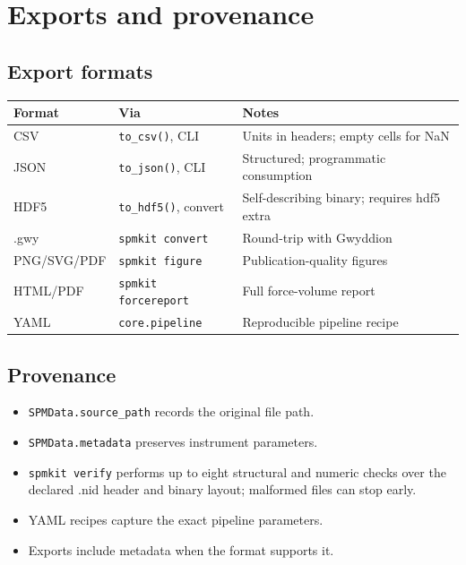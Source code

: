 \documentclass[a4paper,11pt]{article}
\begin{document}
\section{Exports and provenance}

\subsection{Export formats}

\begin{tabularx}{\linewidth}{@{}>{\ttfamily}l l X@{}}
\toprule
Format & Via & Notes \\
\midrule
CSV & \texttt{to\_csv()}, CLI & Units in headers; empty cells for NaN \\
JSON & \texttt{to\_json()}, CLI & Structured; programmatic consumption \\
HDF5 & \texttt{to\_hdf5()}, convert & Self-describing binary; requires hdf5 extra \\
.gwy & \texttt{spmkit convert} & Round-trip with Gwyddion \\
PNG/SVG/PDF & \texttt{spmkit figure} & Publication-quality figures \\
HTML/PDF & \texttt{spmkit forcereport} & Full force-volume report \\
YAML & \texttt{core.pipeline} & Reproducible pipeline recipe \\
\bottomrule
\end{tabularx}

\subsection{Provenance}
\begin{itemize}[nosep]
  \item \texttt{SPMData.source\_path} records the original file path.
  \item \texttt{SPMData.metadata} preserves instrument parameters.
  \item \texttt{spmkit verify} performs up to eight structural and numeric checks over
        the declared .nid header and binary layout; malformed files can stop early.
  \item YAML recipes capture the exact pipeline parameters.
  \item Exports include metadata when the format supports it.
\end{itemize}
\end{document}
